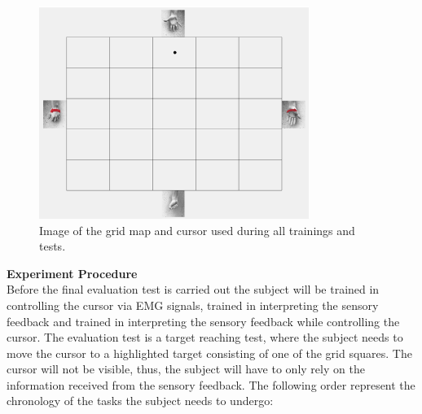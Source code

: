 \begin{figure}[H]                 
	\includegraphics[width=0.78\textwidth]{figures/gridmap}  
	\caption{Image of the grid map and cursor used during all trainings and tests.}
	\label{fig:gridmap} 
\end{figure}

\textbf{{\Large Experiment Procedure}} \\
\newline
Before the final evaluation test is carried out the subject will be trained in controlling the cursor via EMG signals, trained in interpreting the sensory feedback and trained in interpreting the sensory feedback while controlling the cursor. The evaluation test is a target reaching test, where the subject needs to move the cursor to a highlighted target consisting of one of the grid squares. The cursor will not be visible, thus, the subject will have to only rely on the information received from the sensory feedback. The following order represent the chronology of the tasks the subject needs to undergo:

